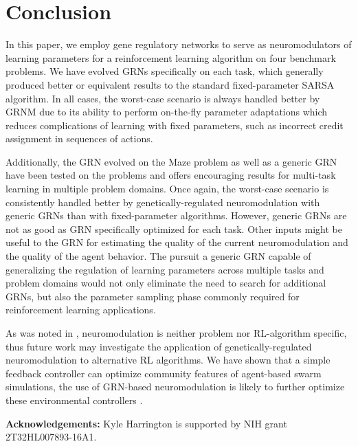 \section{Conclusion}

In this paper, we employ gene regulatory networks to serve as neuromodulators of learning parameters for a reinforcement learning algorithm on four benchmark problems. We have evolved GRNs specifically on each task, which generally produced better or equivalent results to the standard fixed-parameter SARSA algorithm. In all cases, the worst-case scenario is always handled better by GRNM due to its ability to perform on-the-fly parameter adaptations which reduces complications of learning with fixed parameters, such as incorrect credit assignment in sequences of actions.

Additionally, the GRN evolved on the Maze problem as well as a generic GRN have been tested on the problems and offers encouraging results for multi-task learning in multiple problem domains. Once again, the worst-case scenario is consistently handled better by genetically-regulated neuromodulation with generic GRNs than with fixed-parameter algorithms. However, generic GRNs are not as good as GRN specifically optimized for each task. Other inputs might be useful to the GRN for estimating the quality of the current neuromodulation and the quality of the agent behavior. The pursuit a generic GRN capable of generalizing the regulation of learning parameters across multiple tasks and problem domains would not only eliminate the need to search for additional GRNs, but also the parameter sampling phase commonly required for reinforcement learning applications.

As was noted in \cite{Schweighofer2003}, neuromodulation is neither problem nor RL-algorithm specific, thus future work may investigate the application of genetically-regulated neuromodulation to alternative RL algorithms. We have shown that a simple feedback controller can optimize community features of agent-based swarm simulations, the use of GRN-based neuromodulation is likely to further optimize these environmental controllers \cite{Gold2014}. \newline


\textbf{Acknowledgements:} Kyle Harrington is supported by NIH grant 2T32HL007893-16A1.
